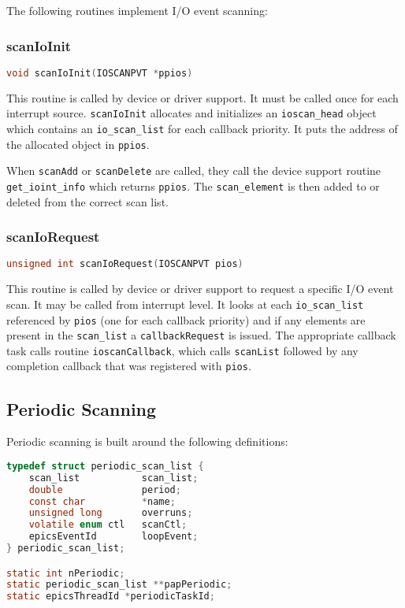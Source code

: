 The following routines implement I/O event scanning:

\subsubsection{scanIoInit}

\begin{lstlisting}[language=C]
void scanIoInit(IOSCANPVT *ppios)
\end{lstlisting}

This routine is called by device or driver support.
It must be called once for each interrupt source.
\verb|scanIoInit| allocates and initializes an \verb|ioscan_head| object which contains an \verb|io_scan_list| for each callback priority.
It puts the address of the allocated object in \verb|ppios|.

When \verb|scanAdd| or \verb|scanDelete| are called, they call the device support routine \verb|get_ioint_info| which returns \verb|ppios|.
The \verb|scan_element| is then added to or deleted from the correct scan list.

\subsubsection{scanIoRequest}

\begin{lstlisting}[language=C]
unsigned int scanIoRequest(IOSCANPVT pios)
\end{lstlisting}

This routine is called by device or driver support to request a specific I/O event scan.
It may be called from interrupt level.
It looks at each \verb|io_scan_list| referenced by \verb|pios| (one for each callback priority) and if any elements are present in the \verb|scan_list| a \verb|callbackRequest| is issued.
The appropriate callback task calls routine \verb|ioscanCallback|, which calls \verb|scanList| followed by any completion callback that was registered with \verb|pios|.

\subsection{Periodic Scanning}

Periodic scanning is built around the following definitions:

\begin{lstlisting}[language=C]
typedef struct periodic_scan_list {
    scan_list           scan_list;
    double              period;
    const char          *name;
    unsigned long       overruns;
    volatile enum ctl   scanCtl;
    epicsEventId        loopEvent;
} periodic_scan_list;

static int nPeriodic;
static periodic_scan_list **papPeriodic;
static epicsThreadId *periodicTaskId;
\end{lstlisting}

